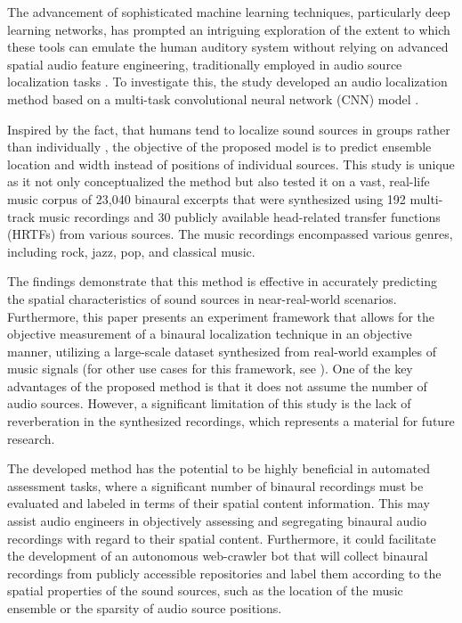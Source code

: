 \documentclass{article}
\begin{document}
The advancement of sophisticated machine learning techniques, particularly deep learning networks, has prompted an intriguing exploration of the extent to which these tools can emulate the human auditory system without relying on advanced spatial audio feature engineering, traditionally employed in audio source localization tasks \cite{yang_deepear_2022, vera-diaz_towards_2018, pang_multitask_2019}. To investigate this, the study developed an audio localization method based on a multi-task convolutional neural network (CNN) model \cite{lecun_handwritten_1989, lecun_deep_2015}.

Inspired by the fact, that humans tend to localize sound sources in groups rather than individually \cite{bregman_auditory_1990, rumsey_spatial_2002}, the objective of the proposed model is to predict ensemble location and width instead of positions of individual sources. This study is unique as it not only conceptualized the method but also tested it on a vast, real-life music corpus of 23,040 binaural excerpts that were synthesized using 192 multi-track music recordings and 30 publicly available head-related transfer functions (HRTFs) from various sources. The music recordings encompassed various genres, including rock, jazz, pop, and classical music.

The findings demonstrate that this method is effective in accurately predicting the spatial characteristics of sound sources in near-real-world scenarios. Furthermore, this paper presents an experiment framework that allows for the objective measurement of a binaural localization technique in an objective manner, utilizing a large-scale dataset synthesized from real-world examples of music signals (for other use cases for this framework, see \cite{antoniuk2023blind, zielinski_automatic_2022, zielinski_spatial_2022, zielinski_comparison_2020}). One of the key advantages of the proposed method is that it does not assume the number of audio sources. However, a significant limitation of this study is the lack of reverberation in the synthesized recordings, which represents a material for future research.

The developed method has the potential to be highly beneficial in automated assessment tasks, where a significant number of binaural recordings must be evaluated and labeled in terms of their spatial content information. This may assist audio engineers in objectively assessing and segregating binaural audio recordings with regard to their spatial content. Furthermore, it could facilitate the development of an autonomous web-crawler bot that will collect binaural recordings from publicly accessible repositories and label them according to the spatial properties of the sound sources, such as the location of the music ensemble or the sparsity of audio source positions.
\end{document}
